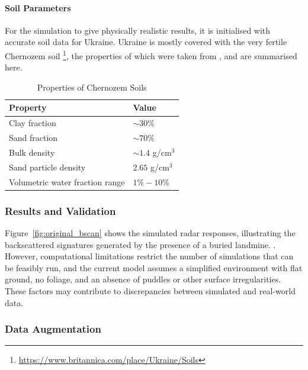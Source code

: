         \paragraph{Soil Parameters}

            For the simulation to give physically realistic results, it is initialised with accurate soil data for Ukraine. Ukraine is mostly covered with the very fertile Chernozem soil \footnote{\url{https://www.britannica.com/place/Ukraine/Soils}}, the properties of which were taken from \cite{suleymanov2021chernozem}, and are summarised here.

            \begin{table}[htbp]
              \centering
              \caption{Properties of Chernozem Soils}
              \begin{tabular}{@{} l l @{}} 
                \toprule
                \textbf{Property} & \textbf{Value} \\
                \midrule
                Clay fraction & $\sim 30\%$ \\
                Sand fraction & $\sim 70\%$ \\
                Bulk density & $\sim 1.4$ g/cm$^3$ \\
                Sand particle density & $2.65$ g/cm$^3$ \\
                Volumetric water fraction range & $1\% - 10\%$ \\
                \bottomrule
              \end{tabular}
            \end{table}
    

    
    \subsubsection{Results and Validation}
    
        Figure~\ref{fig:original_bscan} shows the simulated radar responses, illustrating the backscattered signatures generated by the presence of a buried landmine. . However, computational limitations restrict the number of simulations that can be feasibly run, and the current model assumes a simplified environment with flat ground, no foliage, and an absence of puddles or other surface irregularities. These factors may contribute to discrepancies between simulated and real-world data.

    
    \subsubsection{Data Augmentation}
    
